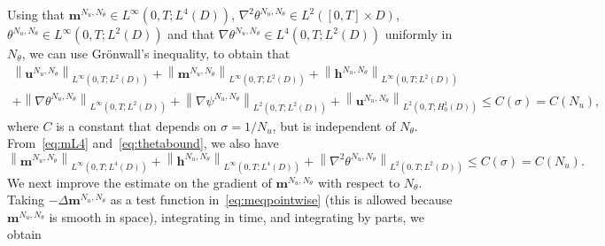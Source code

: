 \documentclass[10pt,letterpaper,twoside]{amsart}
\theoremstyle{definition}{\newtheorem{definition}[lemma]{Definition}}
\theoremstyle{note}{\newtheorem{claim}{Claim}[section]
\newtheorem*{claim*}{Claim}}
\numberwithin{equation}{section}
\newcommand{\dom}{D}
\newcommand{\norm}[1]{\left\| #1 \right\|}
\newcommand{\Grad}{\nabla}
\newcommand{\bmb}{\mathbf{m}^{N_u,N_\theta}}
\newcommand{\bhb}{\mathbf{h}^{N_u,N_\theta}}
\newcommand{\bub}{\mathbf{u}^{N_u,N_\theta}}
\newcommand{\thb}{\theta^{N_u,N_\theta}}
\newcommand{\psib}{\psi^{N_u,N_\theta}}
\begin{document}
Using that $\bmb\in L^\infty(0,T;L^4(\dom))$, $\Grad^2\thb\in L^2([0,T]\times\dom)$, $\thb\in L^\infty(0,T;L^2(\dom))$ and that $\Grad\thb\in L^4(0,T;L^2(\dom))$ uniformly in $N_\theta$, we can use Gr\"onwall's inequality, to obtain that
\begin{multline}\label{eq:uniformboundsenergy}
	\norm{\bub}_{L^\infty(0,T;L^2(\dom))} + \norm{\bmb}_{L^\infty(0,T;L^2(\dom))}+\norm{\bhb}_{L^\infty(0,T;L^2(\dom))}\\
	 +\norm{\Grad\thb}_{L^\infty(0,T;L^2(\dom))}+ \norm{\Grad\psib}_{L^2(0,T;L^2(\dom))}+ \norm{\bub}_{L^2(0,T;H^1_0(\dom))} \leq C(\sigma)=C(N_u),
\end{multline}
where $C$ is a constant that depends on $\sigma=1/N_u$, but is independent of $N_\theta$. 
From~\eqref{eq:mL4} and~\eqref{eq:thetabound}, we also have
\begin{equation}
	\label{eq:uniforminallbutsigma}
	\norm{\bmb}_{L^\infty(0,T;L^4(\dom))}+ \norm{\bhb}_{L^\infty(0,T;L^4(\dom))}+\norm{\Grad^2\thb}_{L^2(0,T;L^2(\dom))}\leq C(\sigma) = C(N_u).
\end{equation}
We next improve the estimate on the gradient of $\bmb$ with respect to $N_\theta$. Taking $-\Delta\bmb  $ as a test function in~\eqref{eq:meqpointwise} (this is allowed because $\bmb$ is smooth in space), integrating in time, and integrating by parts, we obtain
\end{document}
